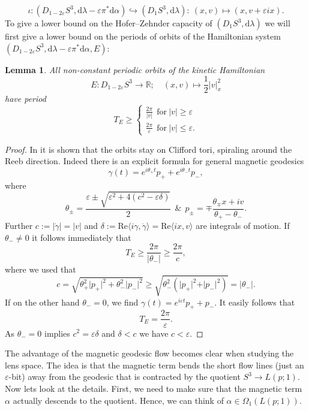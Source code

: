 \documentclass[12pt]{article}
\newtheorem{Lemma}[Definition]{Lemma}
\newcommand{\R}{\mathbb{R}} %
\newcommand{\dd}{\mathrm{d}}
\begin{document}
\begin{equation}\label{shift of zero section}
\iota: (D_{1-2\varepsilon}S^3, \dd\lambda-\varepsilon\pi^*\dd\alpha)\hookrightarrow (D_1 S^3,\dd\lambda):\ (x,v)\mapsto (x,v+\varepsilon ix).
\end{equation}
To give a lower bound on the Hofer--Zehnder capacity of $(D_1 S^3,\dd\lambda)$ we will first give a lower bound on the periods of orbits of the Hamiltonian system $(D_{1-2\varepsilon}S^3, \dd\lambda-\varepsilon\pi^*\dd\alpha, E)$: 
\begin{Lemma}\label{Lower bound for magnetic geodesics on S3}
    All non-constant periodic orbits of the kinetic Hamiltonian
    $$
    E:D_{1-2\varepsilon}S^3\to\R;\quad (x,v)\mapsto \frac{1}{2}\vert v\vert_x^2
    $$
    have period 
    $$
    T_E\geq \begin{cases} \frac{2\pi}{\vert v\vert} \ \ \text{for} \ \vert v\vert\geq\varepsilon\\
     \frac{2\pi}{\varepsilon} \ \ \text{for} \ \vert v\vert\leq\varepsilon.
    \end{cases}
    $$
\end{Lemma}
\begin{proof}
In \cite{ABM} it is shown that the orbits stay on Clifford tori, spiraling around the Reeb direction. Indeed there is an explicit formula for general magnetic geodesics
    $$
    \gamma(t)=e^{i\theta_+t}p_++e^{i\theta_-t}p_-,
    $$
    where
    $$
    \theta_\pm=\frac{\varepsilon\pm\sqrt{\varepsilon^2+4(c^2-\varepsilon\delta)}}{2}\ \ \& \ \ p_\pm=\mp\frac{\theta_\mp x+iv}{\theta_+ -\theta_-}.
    $$
    Further $c:=\vert\dot \gamma\vert=\vert v\vert$ and $\delta:= \mathrm{Re}\langle i\gamma,\dot\gamma\rangle=\mathrm{Re}\langle ix,v\rangle$ are integrals of motion.
    If $\theta_-\neq 0$ it follows immediately that
    $$
    T_E\geq \frac{2\pi}{\vert \theta_-\vert}\geq \frac{2\pi}{c},
    $$
    where we used that
    $$
    c=\sqrt{\theta_+^2\vert p_+\vert^2+\theta_-^2\vert p_-\vert^2}\geq \sqrt{\theta_-^2\left(\vert p_+\vert^2+\vert p_-\vert^2\right)}=\vert \theta_-\vert.
    $$
    If on the other hand $\theta_-=0$, we find $\gamma(t)=e^{i\varepsilon t}p_++p_-$. It easily follows that
    $$
    T_E=\frac{2\pi}{\varepsilon}.
    $$
    As $\theta_-=0$ implies $c^2=\varepsilon\delta$ and $\delta<c$ we have $c<\varepsilon$.
\end{proof}
\noindent
 The advantage of the magnetic geodesic flow becomes clear when studying the lens space. The idea is that the magnetic term bends the short flow lines (just an $\varepsilon$-bit) away from the geodesic that is contracted by the quotient $S^3\to L(p;1)$. Now lets look at the details. First, we need to make sure that the magnetic term $\alpha$ actually descends to the quotient. Hence, we can think of $\alpha\in \Omega_1(L(p;1))$.
\end{document}
